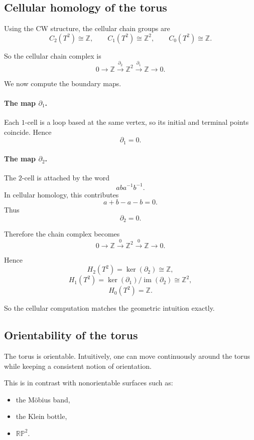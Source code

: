\documentclass[12pt,a4paper]{article}
\theoremstyle{notespace}
\begin{document}
\subsection{Cellular homology of the torus}

Using the CW structure, the cellular chain groups are
\[
C_2(T^2)\cong \mathbb Z,
\qquad
C_1(T^2)\cong \mathbb Z^2,
\qquad
C_0(T^2)\cong \mathbb Z.
\]

So the cellular chain complex is
\[
0\longrightarrow \mathbb Z \xrightarrow{\partial_2} \mathbb Z^2 \xrightarrow{\partial_1} \mathbb Z \longrightarrow 0.
\]

We now compute the boundary maps.

\paragraph{The map \(\partial_1\).}
Each \(1\)-cell is a loop based at the same vertex, so its initial and terminal points coincide. Hence
\[
\partial_1=0.
\]

\paragraph{The map \(\partial_2\).}
The \(2\)-cell is attached by the word
\[
aba^{-1}b^{-1}.
\]
In cellular homology, this contributes
\[
a+b-a-b=0.
\]
Thus
\[
\partial_2=0.
\]

Therefore the chain complex becomes
\[
0\longrightarrow \mathbb Z \xrightarrow{0} \mathbb Z^2 \xrightarrow{0} \mathbb Z \longrightarrow 0.
\]

Hence
\[
H_2(T^2)=\ker(\partial_2)\cong \mathbb Z,
\]
\[
H_1(T^2)=\ker(\partial_1)/\operatorname{im}(\partial_2)\cong \mathbb Z^2,
\]
\[
H_0(T^2)=\mathbb Z.
\]

So the cellular computation matches the geometric intuition exactly.

\subsection{Orientability of the torus}

The torus is orientable. Intuitively, one can move continuously around the torus while keeping a consistent notion of orientation.

This is in contrast with nonorientable surfaces such as:

\begin{itemize}
	\item the Möbius band,
	\item the Klein bottle,
	\item \(\mathbb{RP}^2\).
\end{itemize}
\end{document}
